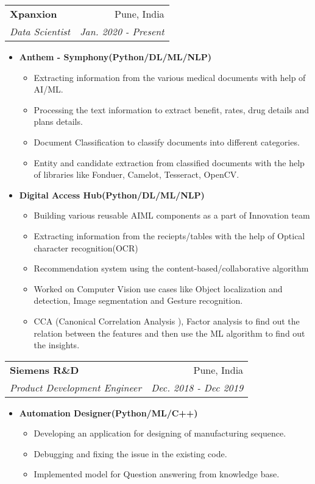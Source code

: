 \documentclass[letterpaper,11pt]{article}
\makeatletter
\newcommand{\resumeItem}[1]{
  \item\small{
    \textbf{#1}}
  }
\newcommand{\resumeSubheading}[4]{
  \vspace{-1pt}\item
    \begin{tabular*}{0.97\textwidth}[t]{l@{\extracolsep{\fill}}r}
      \textbf{#1} & #2 \\
      \textit{\small#3} & \textit{\small #4} \\
    \end{tabular*}\vspace{-5pt}
}
\newcommand{\resumeItemListStart}{\begin{itemize}}
\newcommand{\resumeItemListEnd}{\end{itemize}\vspace{-4pt}}
\newcommand{\resumeSubPointS}{\begin{itemize}}
\newcommand{\resumeSubPointE}{\end{itemize}\vspace{-4pt}}
\makeatother
\begin{document}
  \resumeSubheading
      {Xpanxion}{Pune, India}
      {Data Scientist}{Jan. 2020 - Present}
      \resumeItemListStart
      	\resumeItem{Anthem - Symphony(Python/DL/ML/NLP)}
        	\resumeSubPointS
        		\item Extracting information from the various medical documents with help of AI/ML. 
        		\item Processing the text information to extract benefit, rates, drug details and plans details.
        		\item Document Classification to classify documents into different categories.
        		\item Entity and candidate extraction from classified documents with the help of libraries like Fonduer, Camelot, Tesseract, OpenCV.
        		
        	\resumeSubPointE
        \resumeItem{Digital Access Hub(Python/DL/ML/NLP)}
        	\resumeSubPointS
        		\item Building various reusable AIML components as a part of Innovation team 
        		\item Extracting information from the reciepts/tables with the help of Optical character recognition(OCR)
        		\item Recommendation system using the content-based/collaborative algorithm
        		\item Worked on Computer Vision use cases like Object localization and detection, Image segmentation and Gesture recognition.
        		\item CCA (Canonical Correlation Analysis ), Factor analysis to find out the relation
between the features and then use the ML algorithm to find out the insights.				
        	\resumeSubPointE
          
      \resumeItemListEnd

    \resumeSubheading
      {Siemens R\&D}{Pune, India}
      {Product Development Engineer}{Dec. 2018 - Dec 2019}
      \resumeItemListStart
        \resumeItem{Automation Designer(Python/ML/C++)}
        	\resumeSubPointS
        		\item Developing an application for designing of manufacturing sequence.
        		\item Debugging and fixing the issue in the existing code.
				\item Implemented model for Question answering from knowledge base.
				
        	\resumeSubPointE
 
      \resumeItemListEnd
\end{document}
